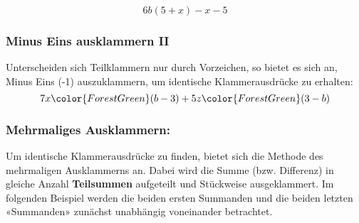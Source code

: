 \begin{beispiel}{}{}
$$6b(5+x) - x- 5$$

\end{beispiel}






\newpage



\subsubsection{Minus Eins ausklammern II}
Unterscheiden sich Teilklammern nur durch Vorzeichen, so bietet es
sich an, Minus Eins (-1) auszuklammern, um identische Klammerausdrücke
zu erhalten:
$$7x{\color{ForestGreen}(b-3)} + 5z{\color{ForestGreen}(3-b)}$$%










\newpage



\subsubsection{Mehrmaliges Ausklammern:}
 Um identische Klammerausdrücke zu finden, bietet sich die Methode des mehrmaligen Ausklammerns an.
 Dabei wird die Summe (bzw. Differenz) in gleiche Anzahl \textbf{Teilsummen} aufgeteilt und Stückweise ausgeklammert.
 Im folgenden Beispiel werden die beiden ersten Summanden und die beiden letzten «Summanden» zunächst unabhängig voneinander betrachtet.

